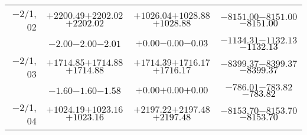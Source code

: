 \documentclass[compress]{beamer}
\begin{document}
\begin{frame}
{\begin{tabular}{r | c | c | c}
$-$2/1, 02 & $+2200.49$\hspace{0.1 cm}$+2202.02$\hspace{0.1 cm}\textcolor{black}{$+2202.02$} & $+1026.04$\hspace{0.1 cm}$+1028.88$\hspace{0.1 cm}\textcolor{black}{$+1028.88$} & $-8151.00$\hspace{0.1 cm}$-8151.00$\hspace{0.1 cm}\textcolor{black}{$-8151.00$} \\
           & $-2.00$\hspace{0.1 cm}$-2.00$\hspace{0.1 cm}\textcolor{black}{$-2.01$} & $+0.00$\hspace{0.1 cm}$-0.00$\hspace{0.1 cm}\textcolor{black}{$-0.03$} & $-1134.31$\hspace{0.1 cm}$-1132.13$\hspace{0.1 cm}\textcolor{black}{$-1132.13$} \\
$-$2/1, 03 & $+1714.85$\hspace{0.1 cm}$+1714.88$\hspace{0.1 cm}\textcolor{black}{$+1714.88$} & $+1714.39$\hspace{0.1 cm}$+1716.17$\hspace{0.1 cm}\textcolor{black}{$+1716.17$} & $-8399.37$\hspace{0.1 cm}$-8399.37$\hspace{0.1 cm}\textcolor{black}{$-8399.37$} \\
           & $-1.60$\hspace{0.1 cm}$-1.60$\hspace{0.1 cm}\textcolor{black}{$-1.58$} & $+0.00$\hspace{0.1 cm}$+0.00$\hspace{0.1 cm}\textcolor{black}{$+0.00$} & $-786.01$\hspace{0.1 cm}$-783.82$\hspace{0.1 cm}\textcolor{black}{$-783.82$} \\
$-$2/1, 04 & $+1024.19$\hspace{0.1 cm}$+1023.16$\hspace{0.1 cm}\textcolor{black}{$+1023.16$} & $+2197.22$\hspace{0.1 cm}$+2197.48$\hspace{0.1 cm}\textcolor{black}{$+2197.48$} & $-8153.70$\hspace{0.1 cm}$-8153.70$\hspace{0.1 cm}\textcolor{black}{$-8153.70$} \\

\end{tabular}}
\end{frame}
\end{document}
